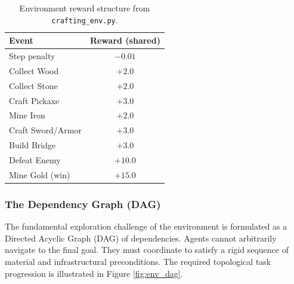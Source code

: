 \begin{table}[H]
\centering
\caption{Environment reward structure from \texttt{crafting\_env.py}.}
\label{tab:env_rewards}
\begin{tabular}{@{}lc@{}}
\toprule
\textbf{Event} & \textbf{Reward (shared)} \\
\midrule
Step penalty      & $-0.01$ \\
Collect Wood      & $+2.0$  \\
Collect Stone     & $+2.0$  \\
Craft Pickaxe     & $+3.0$  \\
Mine Iron         & $+2.0$  \\
Craft Sword/Armor & $+3.0$  \\
Build Bridge      & $+3.0$  \\
Defeat Enemy      & $+10.0$ \\
Mine Gold (win)   & $+15.0$ \\
\bottomrule
\end{tabular}
\end{table}

\subsubsection{The Dependency Graph (DAG)}
\label{subsec:env_dag}

The fundamental exploration challenge of the environment is formulated as a Directed Acyclic Graph (DAG) of dependencies. Agents cannot arbitrarily navigate to the final goal. They must coordinate to satisfy a rigid sequence of material and infrastructural preconditions. The required topological task progression is illustrated in Figure \ref{fig:env_dag}.

